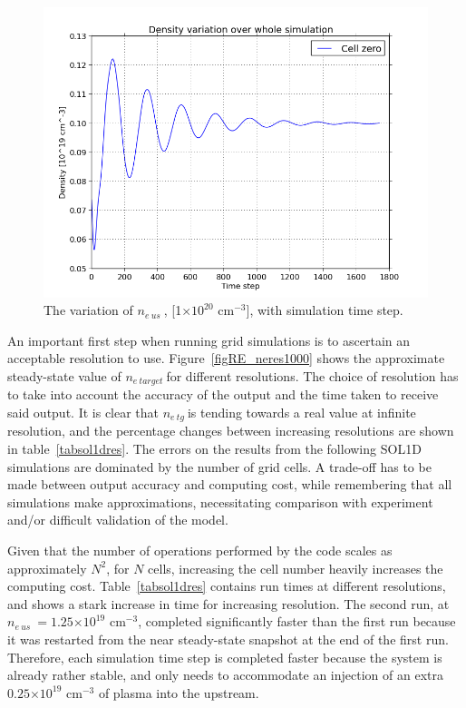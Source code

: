 \documentclass[12pt]{article}  %
\providecommand{\e}[1]{\ensuremath{\times 10^{#1}}} %
\providecommand{\pow}[1]{{$^{#1}$}} %
\providecommand{\neus}{$n_{e~us}~$} %
\providecommand{\netarget}{$n_{e~target}~$} %
\providecommand{\netg}{$n_{e~tg}~$} %
\begin{document}
\begin{figure}
	\includegraphics[scale=0.4]{Figures/sol1d/ne_var_ny=800.png}
	\centering
	\caption{The variation of \neus, [1\e{20} cm\pow{-3}], with simulation time step. }\label{figne_var_ny=800}
\end{figure}

An important first step when running grid simulations is to ascertain an acceptable resolution to use. Figure~\ref{figRE_neres1000} shows the approximate steady-state value of \netarget for different resolutions. The choice of resolution has to take into account the accuracy of the output and the time taken to receive said output. It is clear that \netg is tending towards a real value at infinite resolution, and the percentage changes between increasing resolutions are shown in table~\ref{tabsol1dres}. The errors on the results from the following SOL1D simulations are dominated by the number of grid cells. A trade-off has to be made between output accuracy and computing cost, while remembering that all simulations make approximations, necessitating comparison with experiment and/or difficult validation of the model.

Given that the number of operations performed by the code scales as approximately $N^2$, for $N$ cells, increasing the cell number heavily increases the computing cost. Table~\ref{tabsol1dres} contains run times at different resolutions, and shows a stark increase in time for increasing resolution. The second run, at \neus $= 1.25\e{19}$ cm$^{-3}$, completed significantly faster than the first run because it was restarted from the near steady-state snapshot at the end of the first run. Therefore, each simulation time step is completed faster because the system is already rather stable, and only needs to accommodate an injection of an extra $0.25\e{19}$ cm$^{-3}$ of plasma into the upstream.
\end{document}

